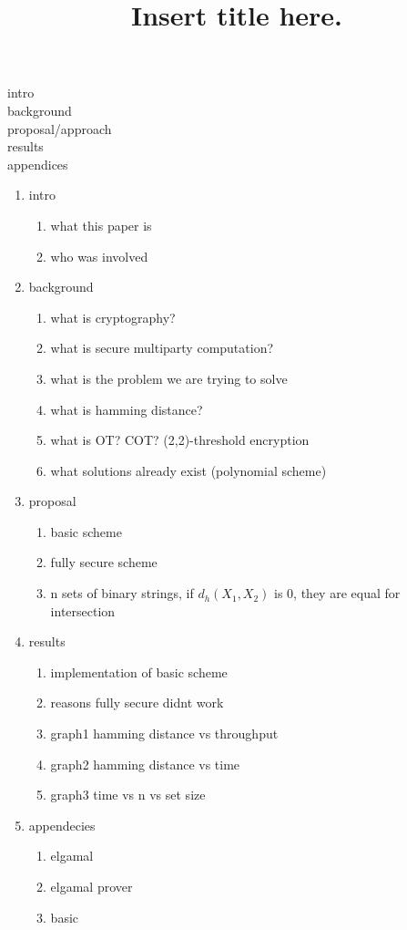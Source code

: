 \documentclass[12pt]{article}
\begin{document}
\title{Insert title here.}


intro
\\background
\\proposal/approach
\\results
\\appendices

\begin{enumerate}
\item intro
	\begin{enumerate}
	\item what this paper is
	\item who was involved
	\end{enumerate}
\item background
	\begin{enumerate}
	\item what is cryptography?
	\item what is secure multiparty computation?
	\item what is the problem we are trying to solve
	\item what is hamming distance?
	\item what is OT? COT? (2,2)-threshold encryption	
	\item what solutions already exist (polynomial scheme) 
	\end{enumerate}
\item proposal
	\begin{enumerate}
	\item basic scheme
	\item fully secure scheme
	\item n sets of binary strings, if $d_h(X_1,X_2)$ is 0, they are equal for intersection
	\end{enumerate}
\item results
	\begin{enumerate}
	\item implementation of basic scheme
	\item reasons fully secure didnt work
	\item graph1 hamming distance vs throughput
	\item graph2 hamming distance vs time
	\item graph3 time vs n vs set size
	\end{enumerate}
\item appendecies
	\begin{enumerate}
	\item elgamal
	\item elgamal prover
	\item basic

\end{enumerate}
\end{enumerate}
\end{document}
